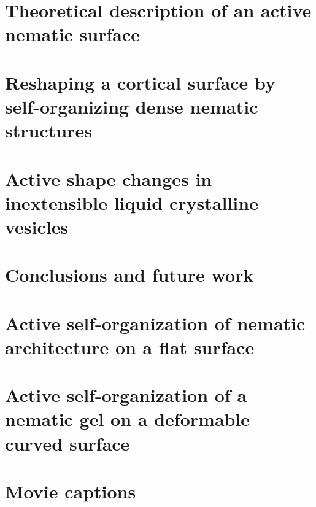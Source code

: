 \documentclass[11pt, final, a4paper, twoside, openright]{book}
\begin{document}
\renewcommand{\thesection}{6.\arabic{section}}
\chapter{Theoretical description of an active nematic surface} \label{chap_7}


\renewcommand{\thesection}{7.\arabic{section}}
\chapter{Reshaping a cortical surface by self-organizing dense nematic structures} \label{chap_8}


\renewcommand{\thesection}{8.\arabic{section}}
\chapter{Active shape changes in inextensible liquid crystalline vesicles}	\label{chap_9}


\renewcommand{\thesection}{9.\arabic{section}}
\chapter{Conclusions and future work}	\label{chap_10}


%
%
\begin{appendices}
	\renewcommand{\thesection}{A.\arabic{section}}
	\chapter{Active self-organization of nematic architecture on a flat surface }   \label{appendix_1}
	
	
	\renewcommand{\thesection}{B.\arabic{section}}
	\chapter{Active self-organization of a nematic gel on a deformable curved surface} \label{appendix_2}
	 
	
	\renewcommand{\thesection}{C.\arabic{section}}
    \chapter{Movie captions} \label{appendix_3}
	  
	 
\end{appendices}

\backmatter
{}
\end{document}
